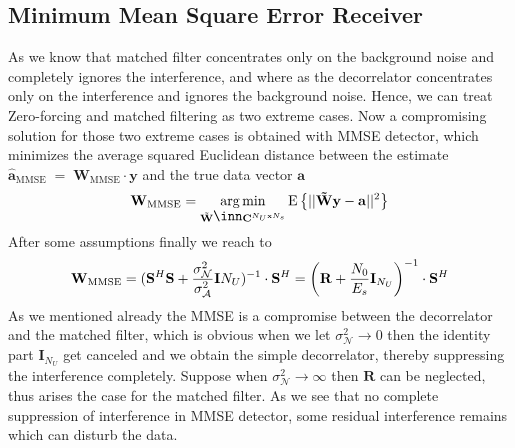 \subsection{Minimum Mean Square Error Receiver}
As we know that matched filter concentrates only on the background noise and completely ignores the interference, and where as the decorrelator concentrates only on the interference and ignores the background noise. Hence, we can treat Zero-forcing and matched filtering as two extreme cases. Now a compromising solution for those two extreme cases is obtained with MMSE detector, which minimizes the average squared Euclidean distance between the estimate $\mathrm{\mathbf{\hat{a}}_{MMSE}}\;=\;\mathrm{\mathbf{W}_{MMSE}}\cdot\mathrm{\mathbf{y}}$ and the true data vector $\mathrm{\mathbf{a}}$
\begin{equation}
\mathrm{\mathbf{W}_{MMSE}}=\argmin_{\tilde{\mathrm{\mathbf{W}}}\in\mathrm{\mathbf{C}}^{N_U\mathrm{x}N_s}}\mathrm{E}\left\{\vert\vert\mathrm{\mathbf{\tilde{W}y}}-\mathrm{\mathbf{a}}\vert\vert^2\right\}
\end{equation}
After some assumptions finally we reach to
\begin{equation}
\mathrm{\mathbf{W}_{MMSE}}=(\mathrm{\mathbf{S}}^H\mathrm{\mathbf{S}}+\frac{\hbox{$\sigma^2_{\mathcal{N}}$}}{\hbox{$\sigma^2_{\mathcal{A}}$}}\mathrm{\mathbf{I}}N_U)^{-1}\cdot\mathrm{\mathbf{S}}^{H}=\left(\mathrm{\mathbf{R}}+\frac{\hbox{$N_0$}}{\hbox{$E_s$}}\mathrm{\mathbf{I}}_{N_U}\right)^{-1}\cdot\mathrm{\mathbf{S}}^H
\end{equation}
As we mentioned already the MMSE is a compromise between the decorrelator and the matched filter, which is obvious when we let $\sigma^2_{\mathcal{N}}\rightarrow 0$ then the identity part $\mathrm{\mathbf{I}}_{N_U}$ get canceled and we obtain the simple decorrelator, thereby suppressing the interference completely. Suppose when  $\sigma^2_{\mathcal{N}}\rightarrow \infty$ then $\mathrm{\mathbf{R}}$ can be neglected, thus arises the case for the matched filter. As we see that no complete suppression of interference in MMSE detector, some residual interference remains which can disturb the data.
